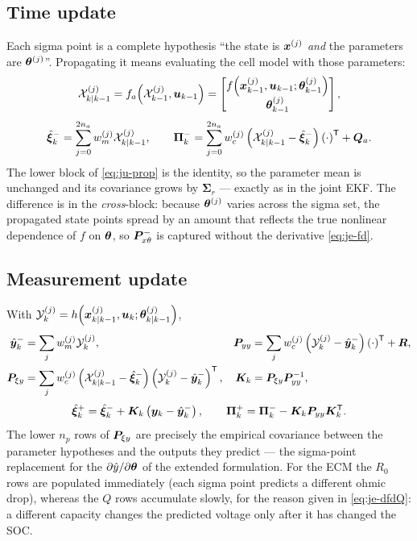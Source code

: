 \subsection{Time update}
Each sigma point is a complete hypothesis ``the state is $\bm{x}^{(j)}$ \emph{and} the parameters are
$\bm{\theta}^{(j)}$''.  Propagating it means evaluating the cell model with those parameters:
\begin{equation}
\mathcal{X}^{(j)}_{k|k-1}
=f_a\!\left(\mathcal{X}^{(j)}_{k-1},\bm{u}_{k-1}\right)
=\begin{bmatrix} f\!\left(\bm{x}^{(j)}_{k-1},\bm{u}_{k-1};\bm{\theta}^{(j)}_{k-1}\right)\\[1mm] \bm{\theta}^{(j)}_{k-1}\end{bmatrix},
\label{eq:ju-prop}
\end{equation}
\begin{equation}
\hat{\bm{\xi}}^-_k=\sum_{j=0}^{2n_a} w^{(j)}_m \mathcal{X}^{(j)}_{k|k-1},
\qquad
\bm{\Pi}^-_k=\sum_{j=0}^{2n_a} w^{(j)}_c\left(\mathcal{X}^{(j)}_{k|k-1}-\hat{\bm{\xi}}^-_k\right)\left(\cdot\right)^{\mathsf{T}}+\bm{Q}_a .
\label{eq:ju-tu}
\end{equation}
The lower block of \eqref{eq:ju-prop} is the identity, so the parameter mean is unchanged and its
covariance grows by $\bm{\Sigma}_r$ --- exactly as in the joint EKF.  The difference is in the
\emph{cross}-block: because $\bm{\theta}^{(j)}$ varies across the sigma set, the propagated state
points spread by an amount that reflects the true nonlinear dependence of $f$ on $\bm{\theta}$, so
$\bm{P}^-_{x\theta}$ is captured without the derivative \eqref{eq:je-fd}.

\subsection{Measurement update}
With $\mathcal{Y}^{(j)}_k=h\!\left(\bm{x}^{(j)}_{k|k-1},\bm{u}_k;\bm{\theta}^{(j)}_{k|k-1}\right)$,
\begin{align}
\hat{\bm{y}}^-_k&=\sum_j w^{(j)}_m \mathcal{Y}^{(j)}_k, &
\bm{P}_{yy}&=\sum_j w^{(j)}_c\left(\mathcal{Y}^{(j)}_k-\hat{\bm{y}}^-_k\right)\left(\cdot\right)^{\mathsf{T}}+\bm{R},\\
\bm{P}_{\xi y}&=\sum_j w^{(j)}_c\left(\mathcal{X}^{(j)}_{k|k-1}-\hat{\bm{\xi}}^-_k\right)\left(\mathcal{Y}^{(j)}_k-\hat{\bm{y}}^-_k\right)^{\mathsf{T}}, &
\bm{K}_k&=\bm{P}_{\xi y}\bm{P}_{yy}^{-1} ,
\label{eq:ju-mu}
\end{align}
\begin{equation}
\hat{\bm{\xi}}^+_k=\hat{\bm{\xi}}^-_k+\bm{K}_k\left(\bm{y}_k-\hat{\bm{y}}^-_k\right),
\qquad
\bm{\Pi}^+_k=\bm{\Pi}^-_k-\bm{K}_k\bm{P}_{yy}\bm{K}_k^{\mathsf{T}} .
\label{eq:ju-mu2}
\end{equation}
The lower $n_p$ rows of $\bm{P}_{\xi y}$ are precisely the empirical covariance between the parameter
hypotheses and the outputs they predict --- the sigma-point replacement for the
$\partial\hat{y}/\partial\bm{\theta}$ of the extended formulation.  For the ECM the $R_0$ rows are
populated immediately (each sigma point predicts a different ohmic drop), whereas the $Q$ rows
accumulate slowly, for the reason given in \eqref{eq:je-dfdQ}: a different capacity changes the
predicted voltage only after it has changed the SOC.

